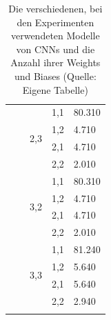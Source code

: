 \documentclass[a4paper,12pt,ngerman,oneside]{scrreprt}	%
\newlength{\shiftdown}
\begin{document}
\begin{footnotesize}
\begin{longtable}[l]{|l|p{60mm}|l|l|l|}
				& & \multirow[t]{4}{*}[\shiftdown]{2,3} & 1,1    & 80.310                         \\ \cline{4-5} 
				& &                     & 1,2    & 4.710                         \\ \cline{4-5} 
				& &                     & 2,1    & 4.710                         \\ \cline{4-5} 
				& &                     & 2,2    & 2.010                         \\ \cline{3-5} 
				& & \multirow[t]{4}{*}[\shiftdown]{3,2} & 1,1    & 80.310                         \\ \cline{4-5} 
				& &                     & 1,2    & 4.710                         \\ \cline{4-5} 
				& &                     & 2,1    & 4.710                         \\ \cline{4-5} 
				& &                     & 2,2    & 2.010                         \\ \cline{3-5} 
				& & \multirow[t]{4}{*}[\shiftdown]{3,3} & 1,1    & 81.240                         \\ \cline{4-5} 
				& &                     & 1,2    & 5.640                         \\ \cline{4-5} 
				& &                     & 2,1    & 5.640                         \\ \cline{4-5} 
				& &                     & 2,2    & 2.940                         \\ \hline
				\caption{Die verschiedenen, bei den Experimenten verwendeten Modelle von CNNs und die Anzahl ihrer Weights und Biases (Quelle: Eigene Tabelle)}
			\end{longtable}
			\end{footnotesize}
		
			\newpage
\end{document}

